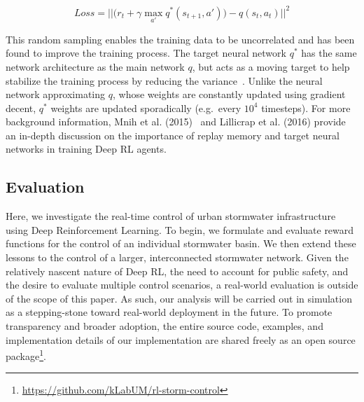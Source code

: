 \begin{equation}
    Loss = ||\big( r_t + \gamma \max_{a'} q^* (s_{t+1},a')\big) - q(s_t,a_t) ||^2
\end{equation}

This random sampling enables the training data to be uncorrelated and has been found to improve the training process.
The target neural network  $q^*$ has the same network architecture as the main network $q$, but acts as a moving target to help stabilize the training process by reducing the variance~\cite{Mnih2015}.
Unlike the neural network approximating $q$, whose weights are constantly updated using gradient decent, $q^*$  weights are updated sporadically (e.g.\ every $10^4$ timesteps).
For more background information, Mnih et al. (2015)~\cite{Mnih2015} and Lillicrap et al.  (2016)\cite{Lillicrap2015ContinuousLearning} provide an in-depth discussion on the importance of replay memory and target neural networks in training Deep RL agents.



\subsection{Evaluation}
Here, we investigate the real-time control of urban stormwater infrastructure using Deep Reinforcement Learning.
To begin, we formulate and evaluate reward functions for the control of an individual stormwater basin.
We then extend these lessons to the control of a larger, interconnected stormwater network.
Given the relatively nascent nature of Deep RL, the need to account for public safety, and the desire to evaluate multiple control scenarios, a real-world evaluation is outside of the scope of this paper.
As such, our analysis will be carried out in simulation as a stepping-stone toward real-world deployment in the future.
To promote transparency and broader adoption, the entire source code, examples, and implementation details of our implementation are shared freely as an open source package\footnote{\href{https://github.com/kLabUM/rl-storm-control}{https://github.com/kLabUM/rl-storm-control}}.


